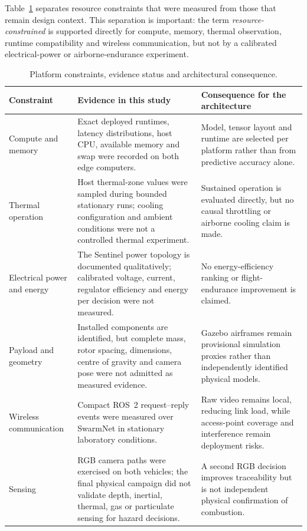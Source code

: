 Table~\ref{tab:platform-constraint-evidence} separates resource constraints
that were measured from those that remain design context. This separation is
important: the term \emph{resource-constrained} is supported directly for
compute, memory, thermal observation, runtime compatibility and wireless
communication, but not by a calibrated electrical-power or airborne-endurance
experiment.

\begin{table}[H]
  \centering
  \caption{Platform constraints, evidence status and architectural consequence.}
  \label{tab:platform-constraint-evidence}
  \scriptsize
  \begin{tabularx}{\textwidth}{@{}p{}p{}X@{}}
    \toprule
    Constraint & Evidence in this study & Consequence for the architecture \\
    \midrule
    Compute and memory & Exact deployed runtimes, latency distributions, host
    CPU, available memory and swap were recorded on both edge computers. &
    Model, tensor layout and runtime are selected per platform rather than from
    predictive accuracy alone. \\
    Thermal operation & Host thermal-zone values were sampled during bounded
    stationary runs; cooling configuration and ambient conditions were not a
    controlled thermal experiment. & Sustained operation is evaluated directly,
    but no causal throttling or airborne cooling claim is made. \\
    Electrical power and energy & The Sentinel power topology is documented
    qualitatively; calibrated voltage, current, regulator efficiency and energy
    per decision were not measured. & No energy-efficiency ranking or flight-
    endurance improvement is claimed. \\
    Payload and geometry & Installed components are identified, but complete
    mass, rotor spacing, dimensions, centre of gravity and camera pose were not
    admitted as measured evidence. & Gazebo airframes remain provisional
    simulation proxies rather than independently identified physical models. \\
    Wireless communication & Compact ROS~2 request--reply events were measured
    over SwarmNet in stationary laboratory conditions. & Raw video remains
    local, reducing link load, while access-point coverage and interference
    remain deployment risks. \\
    Sensing & RGB camera paths were exercised on both vehicles; the final
    physical campaign did not validate depth, inertial, thermal, gas or
    particulate sensing for hazard decisions. & A second RGB decision improves
    traceability but is not independent physical confirmation of combustion. \\
    \bottomrule
  \end{tabularx}
\end{table}

